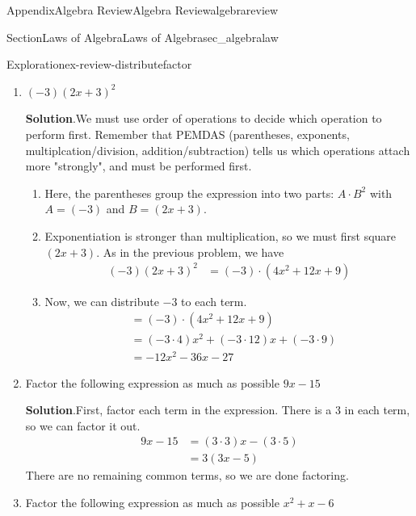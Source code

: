 \documentclass{tufte-book}
\newcommand{\blocktitlefont}{\relax}
\numberwithin{equation}{chapter}
\newcommand{\amp}{&}
\begin{document}
\begin{appendixptx}{Appendix}{Algebra Review}{}{Algebra Review}{}{}{algebrareview}
\begin{sectionptx}{Section}{Laws of Algebra}{}{Laws of Algebra}{}{}{sec_algebralaw}
\begin{exploration}{Exploration}{}{ex-review-distributefactor}
\begin{enumerate}[font=\bfseries,label=(\alph*),ref=\alph*]
\begin{align*}
(2x+3)^2 \amp = (2x+3)\cdot (2x+3)\\
\amp = (2x\cdot 2x) + (2x\cdot 3) + (3\cdot 2x) + (3\cdot 3)\\
\amp = 4x^2 + 6x + 6x + 9\\
\amp = 4x^2 + 12x + 9
\end{align*}
%
\item{}\((-3)(2x+3)^2\)%
\par\smallskip%
\noindent\textbf{\blocktitlefont Solution}.\hypertarget{ex-review-distributefactor-7-2}{}\quad{}We must use order of operations to decide which operation to perform first.  Remember that PEMDAS (parentheses, exponents, multiplcation\slash{}division, addition\slash{}subtraction) tells us which operations attach more "strongly", and must be performed first.%
\begin{enumerate}
\item{}Here, the parentheses group the expression into two parts: \(A\cdot B^2\) with \(A=(-3)\) and \(B=(2x+3)\).%
\item{}Exponentiation is stronger than multiplication, so we must first square \((2x+3)\).  As in the previous problem, we have%
\begin{align*}
(-3)(2x+3)^2\amp = (-3)\cdot (4x^2 + 12x + 9) 
\end{align*}
%
\item{}Now, we can distribute \(-3\) to each term.%
\begin{align*}
\amp = (-3)\cdot (4x^2 + 12x + 9) \\
\amp = (-3\cdot 4) x^2+ (-3\cdot 12)x + (-3\cdot 9)\\
\amp = -12x^2 - 36x - 27
\end{align*}
%
\end{enumerate}
%
\item{}Factor the following expression as much as possible \(9x - 15\)%
\par\smallskip%
\noindent\textbf{\blocktitlefont Solution}.\hypertarget{ex-review-distributefactor-8-2}{}\quad{}First, factor each term in the expression. There is a 3 in each term, so we can factor it out.%
\begin{align*}
9x - 15 \amp = (3\cdot 3)x - (3\cdot 5) \\
\amp = 3 (3x - 5)
\end{align*}
There are no remaining common terms, so we are done factoring.%
\item{}Factor the following expression as much as possible \(x^2 + x - 6 \)%
\par\smallskip%

\end{enumerate}
\end{exploration}
\end{sectionptx}
\end{appendixptx}
\end{document}
